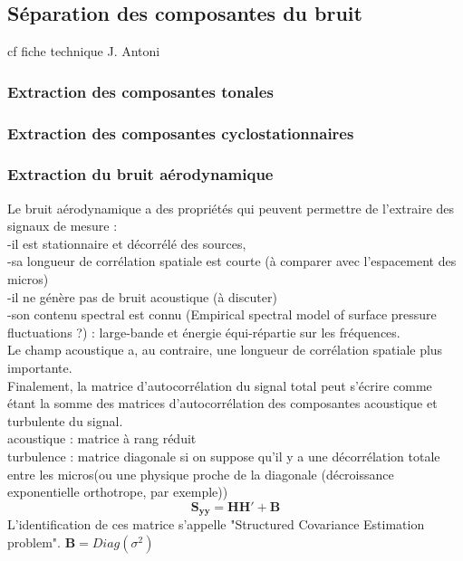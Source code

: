 \subsection{Séparation des composantes du bruit}
cf fiche technique J. Antoni

\subsubsection{Extraction des composantes tonales}


\subsubsection{Extraction des composantes cyclostationnaires}


\subsubsection{Extraction du bruit aérodynamique}

Le bruit aérodynamique a des propriétés qui peuvent permettre de l'extraire des signaux de mesure : \\
-il est stationnaire et décorrélé des sources,\\
-sa longueur de corrélation spatiale est courte (à comparer avec l'espacement des micros) \\
-il ne génère pas de bruit acoustique (à discuter)\\
-son contenu spectral est connu (Empirical spectral model of surface pressure fluctuations ?) : large-bande et énergie équi-répartie sur les fréquences.\\

Le champ acoustique a, au contraire, une longueur de corrélation spatiale plus importante.\\

Finalement, la matrice d'autocorrélation du signal total peut s'écrire comme étant la somme des matrices d'autocorrélation des composantes acoustique et turbulente du signal. \\

acoustique : matrice à rang réduit\\
turbulence : matrice diagonale si on suppose qu'il y a une décorrélation totale entre les micros(ou une physique proche de la diagonale (décroissance exponentielle orthotrope, par exemple))\\

\begin{equation}
\bm{S_{yy}} = \bm{HH}' + \bm{B}
\end{equation}
L'identification de ces matrice s'appelle "Structured Covariance Estimation problem".
$\bm{B}=Diag(\sigma^{2})$


